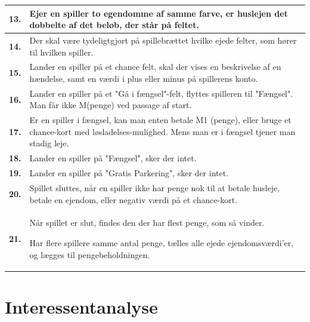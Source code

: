 \begin{tabular}{| l |p{13cm}|}
    \hline
    \textbf{13.}
    &
    Ejer en spiller to egendomme af samme farve, er huslejen det dobbelte af det beløb, der står på feltet. 
    \\
    
    \hline
    \textbf{14.} 
    &
    Der skal være tydeligtgjort på spillebrættet hvilke ejede felter, som hører til hvilken spiller. 
    \\
      
    \hline
    \textbf{15.}
    &
    Lander en spiller på et chance felt, skal der vises en beskrivelse af en hændelse, samt en værdi i plus eller minus på spillerens konto. 
    \\

    \hline
    \textbf{16.}
    &
    Lander en spiller på et "Gå i fængsel"-felt, flyttes spilleren til "Fængsel". Man får ikke M(penge) ved passage af start. 
    \\
      
    \hline
    \textbf{17.}
    &
    Er en spiller i fængsel, kan man enten betale M1 (penge), eller bruge et chance-kort med løsladelses-mulighed. Mens man er i fængsel tjener man stadig leje. 
    \\
      
    \hline
    \textbf{18.}
    &
    Lander en spiller på "Fængsel", sker der intet. 
    \\
      
    \hline
    \textbf{19.}
    &
    Lander en spiller på "Gratis Parkering", sker der intet. 
    \\
      
    \hline
    \textbf{20.}
    &
    Spillet sluttes, når en spiller ikke har penge nok til at betale husleje, betale en ejendom, eller negativ værdi på et chance-kort. 
    \\
      
    \hline
    \textbf{21.}
    &
    Når spillet er slut, findes den der har flest penge, som så vinder. 
    
    Har flere spillere samme antal penge, tælles alle ejede ejendomsværdi’er, og lægges til pengebeholdningen. 
    \\
      
    \hline
\end{tabular}

\pagebreak

\section{Interessentanalyse}

